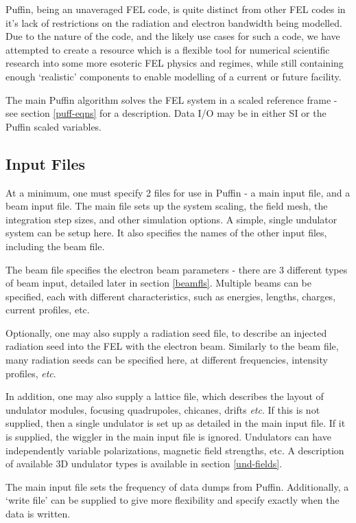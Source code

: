 \documentclass[12pt]{article}%
\begin{document}
Puffin, being an unaveraged FEL code, is quite distinct from other FEL codes in it's lack of restrictions on the radiation and electron bandwidth being modelled. Due to the nature of the code, and the likely use cases for such a code, we have attempted to create a resource which is a flexible tool for numerical scientific research into some more esoteric FEL physics and regimes, while still containing enough `realistic'  components to enable modelling of a current or future facility.

The main Puffin algorithm solves the FEL system in a scaled reference frame - see section \ref{puff-eqns} for a description. Data I/O may be in either SI or the Puffin scaled variables.

\subsection{Input Files}

At a minimum, one must specify 2 files for use in Puffin - a main input file, and a beam input file. The main file sets up the system scaling, the field mesh, the integration step sizes, and other simulation options. A simple, single undulator system can be setup here. It also specifies the names of the other input files, including the beam file.

The beam file specifies the electron beam parameters - there are 3 different types of beam input, detailed later in section \ref{beamfls}. Multiple beams can be specified, each with different characteristics, such as energies, lengths, charges, current profiles, etc.

Optionally, one may also supply a radiation seed file, to describe an injected radiation seed into the FEL with the electron beam. Similarly to the beam file, many radiation seeds can be specified here, at different frequencies, intensity profiles, \textit{etc}.

In addition, one may also supply a lattice file, which describes the layout of undulator modules, focusing quadrupoles, chicanes, drifts \textit{etc}. If this is not supplied, then a single undulator is set up as detailed in the main input file. If it is supplied, the wiggler in the main input file is ignored. Undulators can have independently variable polarizations, magnetic field strengths, etc. A description of available 3D undulator types is available in section \ref{und-fields}.

The main input file sets the frequency of data dumps from Puffin. Additionally, a `write file' can be supplied to give more flexibility and specify exactly when the data is written.
\end{document}
